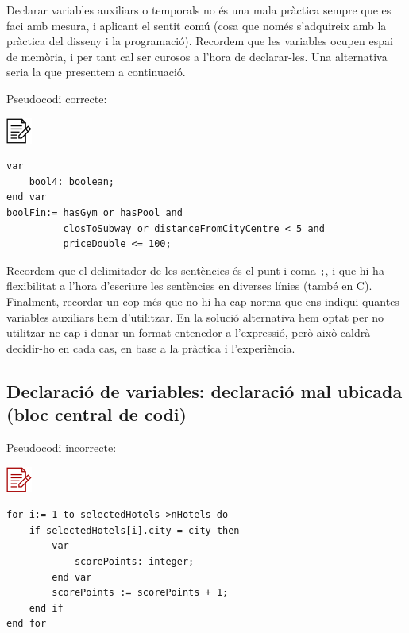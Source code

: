 \documentclass[
]{book}
\begin{document}
Declarar variables auxiliars o temporals no és una mala pràctica sempre que es faci amb mesura, i aplicant el sentit comú (cosa que només s'adquireix amb la pràctica del disseny i la programació). Recordem que les variables ocupen espai de memòria, i per tant cal ser curosos a l'hora de declarar-les. Una alternativa seria la que presentem a continuació.

Pseudocodi correcte:

\includegraphics{./img/alg.png}

\begin{verbatim}
var
    bool4: boolean;
end var
boolFin:= hasGym or hasPool and 
          closToSubway or distanceFromCityCentre < 5 and 
          priceDouble <= 100;
\end{verbatim}

Recordem que el delimitador de les sentències és el punt i coma \texttt{;}, i que hi ha flexibilitat a l'hora d'escriure les sentències en diverses línies (també en C). Finalment, recordar un cop més que no hi ha cap norma que ens indiqui quantes variables auxiliars hem d'utilitzar. En la solució alternativa hem optat per no utilitzar-ne cap i donar un format entenedor a l'expressió, però això caldrà decidir-ho en cada cas, en base a la pràctica i l'experiència.

\hypertarget{declaraciuxf3-de-variables-declaraciuxf3-mal-ubicada-bloc-central-de-codi}{%
\subsection{Declaració de variables: declaració mal ubicada (bloc central de codi)}\label{declaraciuxf3-de-variables-declaraciuxf3-mal-ubicada-bloc-central-de-codi}}

Pseudocodi incorrecte:

\includegraphics{./img/alg_err.png}

\begin{verbatim}
for i:= 1 to selectedHotels->nHotels do 
    if selectedHotels[i].city = city then 
        var
            scorePoints: integer;
        end var
        scorePoints := scorePoints + 1;
    end if
end for
\end{verbatim}
\end{document}
